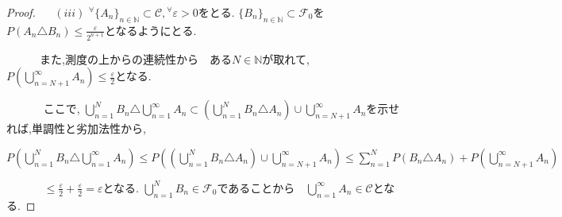 \documentclass{jsarticle}
\begin{document}
\begin{proof}
$\quad$ $(iii)$ ${}^\forall \lbrace A_{n} \rbrace_{n \in \mathbb{N}} \subset \mathcal{C}, {}^\forall \varepsilon > 0$をとる. $\lbrace B_{n} \rbrace_{n \in \mathbb{N}} \subset \mathcal{F}_{0}$を$P(A_{n} \triangle B_{n}) \le \frac{\varepsilon}{2^{n+1}} $となるようにとる.\par 
$\quad \qquad$また,測度の上からの連続性から　ある$N \in \mathbb{N}$が取れて, $P( \displaystyle\bigcup_{n=N+1}^{\infty} A_{n}) \le \frac{\varepsilon}{2}$となる.\par$\quad \qquad$ ここで, $\displaystyle\bigcup_{n=1}^{N} B_{n} \triangle \displaystyle\bigcup_{n=1}^{\infty} A_{n} \subset (\displaystyle\bigcup_{n=1}^{N} B_{n} \triangle A_{n}) \cup \displaystyle\bigcup_{n=N+1}^{\infty} A_{n}$を示せれば,単調性と劣加法性から,\par $\quad \qquad$ $P(\displaystyle\bigcup_{n=1}^{N} B_{n} \triangle \displaystyle\bigcup_{n=1}^{\infty} A_{n}) \le P((\displaystyle\bigcup_{n=1}^{N} B_{n} \triangle A_{n}) \cup \displaystyle\bigcup_{n=N+1}^{\infty} A_{n}) \le  \displaystyle\sum_{n=1}^{N}P(B_{n} \triangle A_{n}) + P(\displaystyle\bigcup_{n=N+1}^{\infty} A_{n})$ \par $\quad \qquad$ $\le \frac{\varepsilon}{2} + \frac{\varepsilon}{2} = \varepsilon $となる. $\displaystyle\bigcup_{n=1}^{N} B_{n} \in \mathcal{F}_{0}$であることから　$\displaystyle\bigcup_{n=1}^{\infty} A_{n} \in \mathcal{C}$となる.\par


\end{proof}
\end{document}
